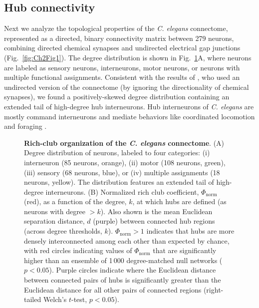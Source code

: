 \subsection{Hub connectivity}

Next we analyze the topological properties of the \emph{C. elegans} connectome, represented as a directed, binary connectivity matrix between 279 neurons, combining directed chemical synapses and undirected electrical gap junctions (Fig.~\ref{fig:Ch2Fig1}).
The degree distribution is shown in Fig.~\ref{fig:Ch2Fig5}A, where neurons are labeled as sensory neurons, interneurons, motor neurons, or neurons with multiple functional assignments.
Consistent with the results of \citet{Towlson2013},  who used an undirected version of the connectome (by ignoring the directionality of chemical synapses), we found a positively-skewed degree distribution containing an extended tail of high-degree hub interneurons.
Hub interneurons of \emph{C. elegans} are mostly command interneurons and mediate behaviors like coordinated locomotion and foraging \citep{Tsalik2003}.


\begin{figure}[!h]
 \caption{\textbf{Rich-club organization of the \emph{C. elegans} connectome}.
(A) Degree distribution of neurons, labeled to four categories:
(i) interneuron (85 neurons, orange),
(ii) motor (108 neurons, green),
(iii) sensory (68 neurons, blue), or
(iv) multiple assignments (18 neurons, yellow).
The distribution features an extended tail of high-degree interneurons.
(B)
Normalized rich club coefficient, $\Phi_\mathrm{norm}$ (red), as a function of the degree, $k$, at which hubs are defined (as neurons with degree $>k$).
Also shown is the mean Euclidean separation distance, $d$ (purple) between connected hub regions (across degree thresholds, $k$).
$\Phi_\mathrm{norm} > 1$ indicates that hubs are more densely interconnected among each other than expected by chance, with red circles indicating values of $\Phi_\mathrm{norm}$ that are significantly higher than an ensemble of 1\,000 degree-matched null networks ($p < 0.05$).
Purple circles indicate where the Euclidean distance between connected pairs of hubs is significantly greater than the Euclidean distance for all other pairs of connected regions (right-tailed Welch's $t$-test, $p < 0.05$).
}
 \label{fig:Ch2Fig5}
\end{figure}


